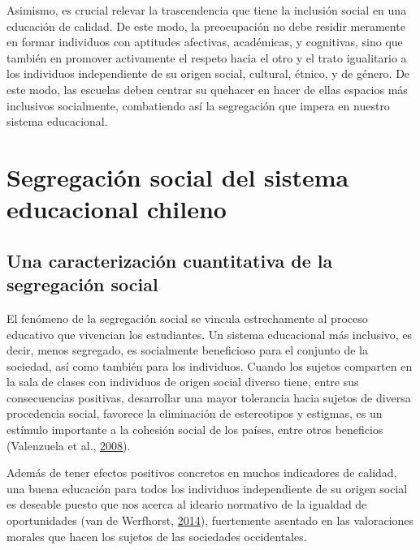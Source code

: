 \documentclass[
]{article}
\begin{document}
Asimismo, es crucial relevar la trascendencia que tiene la inclusión
social en una educación de calidad. De este modo, la preocupación no
debe residir meramente en formar individuos con aptitudes afectivas,
académicas, y cognitivas, sino que también en promover activamente el
respeto hacia el otro y el trato igualitario a los individuos
independiente de su origen social, cultural, étnico, y de género. De
este modo, las escuelas deben centrar su quehacer en hacer de ellas
espacios más inclusivos socialmente, combatiendo así la segregación que
impera en nuestro sistema educacional.

\hypertarget{segregaciuxf3n-social-del-sistema-educacional-chileno}{%
\section{Segregación social del sistema educacional
chileno}\label{segregaciuxf3n-social-del-sistema-educacional-chileno}}

\hypertarget{una-caracterizaciuxf3n-cuantitativa-de-la-segregaciuxf3n-social}{%
\subsection{Una caracterización cuantitativa de la segregación
social}\label{una-caracterizaciuxf3n-cuantitativa-de-la-segregaciuxf3n-social}}

El fenómeno de la segregación social se vincula estrechamente al proceso
educativo que vivencian los estudiantes. Un sistema educacional más
inclusivo, es decir, menos segregado, es socialmente beneficioso para el
conjunto de la sociedad, así como también para los individuos. Cuando
los sujetos comparten en la sala de clases con individuos de origen
social diverso tiene, entre sus consecuencias positivas, desarrollar una
mayor tolerancia hacia sujetos de diversa procedencia social, favorece
la eliminación de estereotipos y estigmas, es un estímulo importante a
la cohesión social de los países, entre otros beneficios (Valenzuela et
al., \protect\hyperlink{ref-valenzuela_evolucion_2008}{2008}).

Además de tener efectos positivos concretos en muchos indicadores de
calidad, una buena educación para todos los individuos independiente de
su origen social es deseable puesto que nos acerca al ideario normativo
de la igualdad de oportunidades (van de Werfhorst,
\protect\hyperlink{ref-vandewerfhorst_changing_2014}{2014}), fuertemente
asentado en las valoraciones morales que hacen los sujetos de las
sociedades occidentales.
\end{document}
